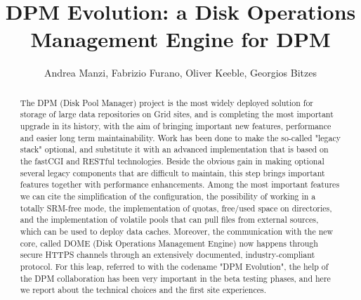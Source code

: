 \documentclass[a4paper]{jpconf}
\begin{document}


\title{
DPM Evolution: a Disk Operations Management Engine for DPM}

\author{Andrea Manzi, Fabrizio Furano, Oliver Keeble, Georgios Bitzes}

\address{CERN IT}


\begin{abstract}

The DPM (Disk Pool Manager) project is the most widely deployed solution for storage of
large data repositories on Grid sites, and is completing the most important upgrade
in its history, with the aim of bringing important new features, performance
and easier long term maintainability.
Work has been done to make the so-called "legacy stack" optional, and substitute
it with an advanced implementation that is based on the fastCGI and RESTful technologies.
Beside the obvious gain in making optional several legacy components that
are difficult to maintain, this step brings important features together with
performance enhancements. Among the most important features we can cite the
simplification of the configuration, the possibility of working in a totally
SRM-free mode, the implementation of quotas, free/used space on directories,
and the implementation of volatile pools that can pull files from external
sources, which can be used to deploy data caches.
Moreover, the communication with the new core, called DOME
(Disk Operations Management Engine) now happens through secure HTTPS channels
through an extensively documented, industry-compliant protocol.
For this leap, referred to with the codename "DPM Evolution", the help of the
DPM collaboration has been very important in the beta testing phases,
and here we report about the technical choices and the first site experiences.

\end{abstract}



\newpage %


\end{document}
